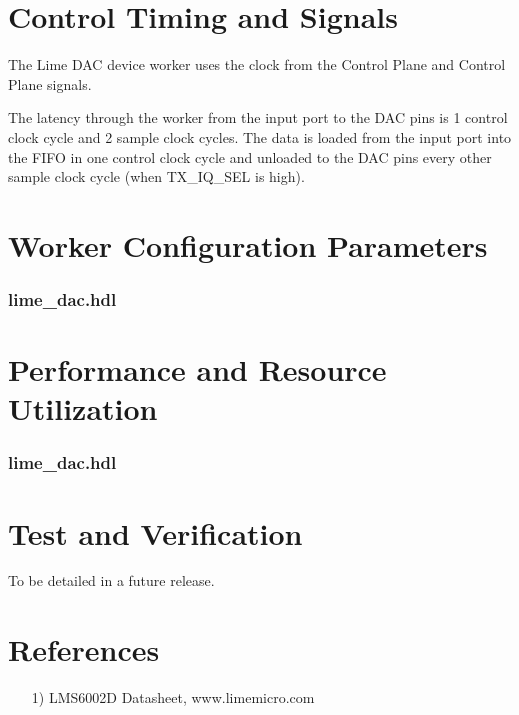 \documentclass{article}
\def\comp{lime\_dac}
\edef\ecomp{lime_dac}
\begin{document}
		\section*{Control Timing and Signals}
		The Lime DAC device worker uses the clock from the Control Plane and Control Plane signals.\par\bigskip
		\noindent The latency through the worker from the input port to the DAC pins is 1 control clock cycle and 2 sample clock cycles. The data is loaded from the input port into the FIFO in one control clock cycle and unloaded to the DAC pins every other sample clock cycle (when TX\_IQ\_SEL is high).

\begin{landscape}
\section*{Worker Configuration Parameters}
\subsubsection*{\comp.hdl}

\section*{Performance and Resource Utilization}
\subsubsection*{\comp.hdl}

\end{landscape}
	\section*{Test and Verification}
	\begin{flushleft}
	 To be detailed in a future release.
	\end{flushleft}
	\section*{References}
	\begin{flushleft}
		\begin{itemize}
			\item[1)] LMS6002D Datasheet, www.limemicro.com
		\end{itemize}
	\end{flushleft}
\end{document}
